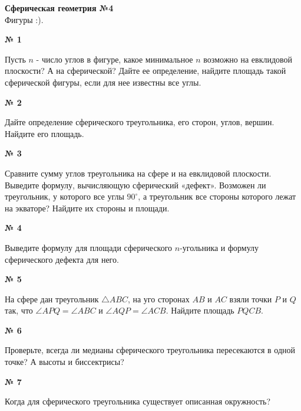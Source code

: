 


    \begin{center}
        \textbf{Сферическая геометрия №4}\\
        Фигуры :).
    \end{center}

    \begin{center}
        \textbf{№ 1}
    \end{center}
    Пусть $n$ - число углов в фигуре, какое минимальное $n$ возможно на евклидовой плоскости?
    А на сферической?
    Дайте ее определение, найдите площадь такой сферической фигуры, если для нее известны все углы.

    \begin{center}
        \textbf{№ 2}
    \end{center}

    Дайте определение сферического треугольника, его сторон, углов, вершин.
    Найдите его площадь.

    \begin{center}
        \textbf{№ 3}
    \end{center}

    Сравните сумму углов треугольника на сфере и на евклидовой плоскости.
    Выведите формулу, вычисляющую сферический «дефект».
    Возможен ли треугольник, у которого все углы $90^\circ$,
    а треугольник все стороны которого лежат на экваторе?
    Найдите их стороны и площади.

    \begin{center}
        \textbf{№ 4}
    \end{center}

    Выведите формулу для площади сферического $n$-угольника и формулу сферического дефекта для него.

    \begin{center}
        \textbf{№ 5}
    \end{center}
    На сфере дан треугольник $\triangle ABC$, на уго сторонах $AB$ и $AC$ взяли
    точки $P$ и $Q$ так, что $\angle APQ = \angle ABC$ и $\angle AQP = \angle ACB$.
    Найдите площадь $PQCB$.

    \begin{center}
        \textbf{№ 6}
    \end{center}
    Проверьте, всегда ли медианы сферического треугольника пересекаются в одной точке?
    А высоты и биссектрисы?

    \begin{center}
        \textbf{№ 7}
    \end{center}
    Когда для сферического треугольника существует описанная окружность?

